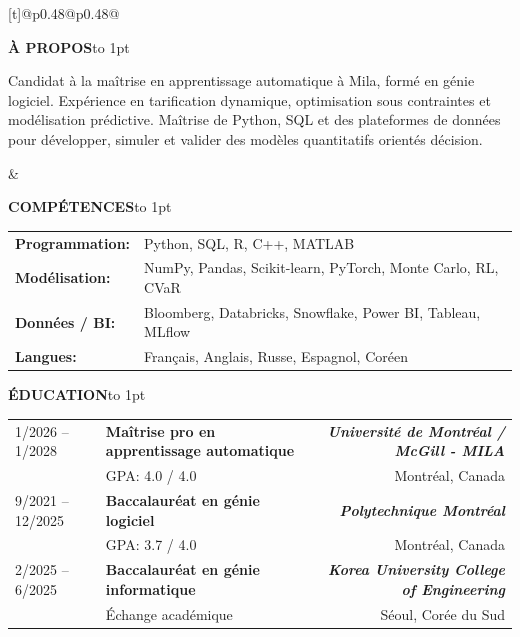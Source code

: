 \documentclass[a4paper,10pt]{article}
\newcommand{\sechead}[1]{\vspace{0.4em}\noindent\textbf{\large #1}\hspace{0.8em}\leaders\hbox to 1pt{\hss\raisebox{0.3em}{\rule{1pt}{0.4pt}}\hss}\hfill\null\par\vspace{0.45em}}
\begin{document}
    \noindent
    \begin{tabularx}{\textwidth}[t]{@{}p{0.48\textwidth}@{\hspace{2em}}p{0.48\textwidth}@{}}
      \parbox[t]{\linewidth}{
        \sechead{À PROPOS}
            Candidat à la maîtrise en apprentissage automatique à Mila, formé en génie logiciel. Expérience en tarification dynamique, optimisation sous contraintes et modélisation prédictive. Maîtrise de Python, SQL et des plateformes de données pour développer, simuler et valider des modèles quantitatifs orientés décision.
      }
      &
      \parbox[t]{\linewidth}{
        \sechead{COMPÉTENCES}
        \begin{tabular}{@{}p{2.7cm}>{\raggedright\arraybackslash}p{\dimexpr\linewidth-3.2cm}@{}}
          \textbf{Programmation:} & Python, SQL, R, C++, MATLAB \\[0.2em]
          \textbf{Modélisation:} & NumPy, Pandas, Scikit-learn, PyTorch, Monte Carlo, RL, CVaR \\[0.2em]
          \textbf{Données / BI:} & Bloomberg, Databricks, Snowflake, Power BI, Tableau, MLflow
          \\[0.2em]
          \textbf{Langues:} & Français, Anglais, Russe, Espagnol, \mbox{Coréen}
        \end{tabular}
      }
    \end{tabularx}
    
    \vspace{0.2em}
    \sechead{ÉDUCATION}
    
    \begin{tabularx}{\textwidth}{@{}p{3cm} X r@{}}
        1/2026 -- 1/2028 & 
        \textbf{Maîtrise pro en apprentissage automatique} 
        & \textbf{\textit{Université de Montréal / McGill  - MILA}} \\ 
        & GPA: 4.0 / 4.0 & 
        Montréal, Canada \\[0.2em]
        
        9/2021 -- 12/2025 & 
        \textbf{Baccalauréat en génie logiciel} 
        & \textbf{\textit{Polytechnique Montréal}} \\ 
        & GPA: 3.7 / 4.0 & 
        Montréal, Canada \\[0.2em]
        
        2/2025 -- 6/2025 & 
        \textbf{Baccalauréat en génie informatique} 
        & \textbf{\textit{Korea University College of Engineering}} \\ 
        & Échange académique & 
        Séoul, Corée du Sud
    \end{tabularx}
    
\end{document}
